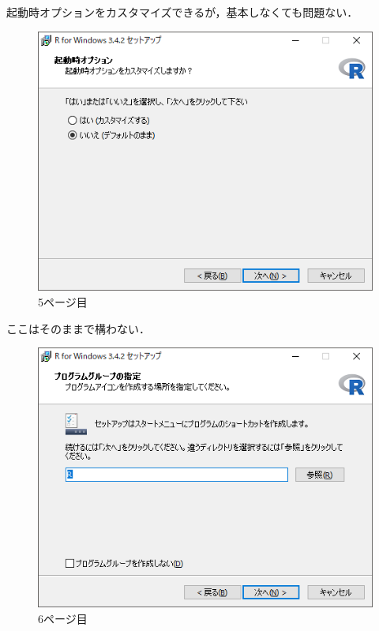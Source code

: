 \newpage

起動時オプションをカスタマイズできるが，基本しなくても問題ない．

\begin{figure}[!htbp]
\centering 
\includegraphics[width=13cm]{rinstall5.png}
\caption{5ページ目}
\end{figure}

\newpage

ここはそのままで構わない．

\begin{figure}[!htbp]
\centering 
\includegraphics[width=13cm]{rinstall6.png}
\caption{6ページ目}
\end{figure}

